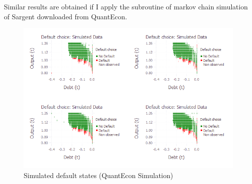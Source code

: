 \documentclass[12pt, a4paper]{article}
\begin{document}
Similar results are obtained if I apply the subroutine of markov chain simulation of Sargent downloaded from QuantEcon.
\begin{figure}[!hbt]
	\centering
	\caption{Simulated default states (QuantEcon Simulation)}
	\includegraphics[scale=0.7]{../Plots/heats(Quant).png}
	\begin{minipage}{0.65\textwidth}
		{\scriptsize\par}
	\end{minipage}
\end{figure}
\end{document}
